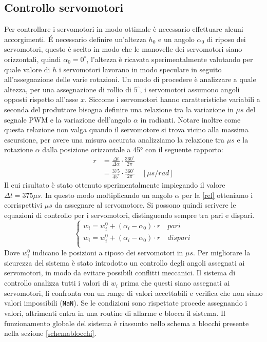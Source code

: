 \documentclass[12pt,twoside,openright]{report}
\begin{document}
\subsection{Controllo servomotori}
Per controllare i servomotori in modo ottimale è necessario effettuare alcuni accorgimenti.
É necessario definire un'altezza $h_0$ e un angolo $\alpha_0$ di riposo dei servomotori, questo è scelto in modo che le manovelle dei servomotori siano orizzontali, quindi $\alpha_0=0^\circ$, l'altezza è ricavata sperimentalmente valutando per quale valore di $h$ i servomotori lavorano in modo speculare in seguito all'assegnazione delle varie rotazioni.
Un modo di procedere è analizzare a quale altezza, per una assegnazione di rollio di $5^\circ$, i servomotori assumono angoli opposti rispetto all'asse $x$.
Siccome i servomotori hanno caratteristiche variabili a seconda del produttore bisogna definire una relazione tra la variazione in $\mu s$ del segnale PWM e la variazione dell'angolo $\alpha$ in radianti. Notare inoltre come questa relazione non valga quando il servomotore si trova vicino alla massima escursione, per avere una misura accurata analizziamo la relazione tra $\mu s$ e la rotazione $\alpha$ dalla posizione orizzontale a 45° con il seguente rapporto:
\begin{align}\label{rel}
r &=\frac{\Delta t}{\Delta\alpha}\cdot \frac{360^\circ}{2 \pi}\nonumber\\
	&= \frac{375}{45^\circ}\cdot \frac{360^\circ}{2 \pi} \quad [\mu s/rad]
\end{align}
Il cui risultato è stato ottenuto sperimentalmente impiegando il valore $\Delta t = 375 \mu s$. In questo modo moltiplicando un angolo $\alpha$ per la \eqref{rel} otteniamo i corrispettivi $\mu s$ da assegnare al servomotore. Si possono quindi scrivere le equazioni di controllo per i servomotori, distinguendo sempre tra pari e dispari.
\begin{equation}\label{w}
    \begin{cases}
      w_i=w_i^0 +(\alpha_i-\alpha_0)\cdot r	\quad pari \\
      w_i=w_i^0 +(\alpha_i-\alpha_0)\cdot r	\quad dispari \\
    \end{cases}
\end{equation}
Dove $w_i^0$ indicano le posizioni a riposo dei servomotori in $\mu s$.
Per migliorare la sicurezza del sistema è stato introdotto un controllo degli angoli assegnati ai servomotori, in modo da evitare possibili conflitti meccanici.
Il sistema di controllo analizza tutti i valori di $w_i$ prima che questi siano assegnati ai servomotori, li confronta con un range di valori accettabili e verifica che non siano valori impossibili (\texttt{NaN}).
Se le condizioni sono rispettate procede assegnando i valori, altrimenti entra in una routine di allarme e blocca il sistema. Il funzionamento globale del sistema è riassunto nello schema a blocchi presente nella sezione \ref{schemablocchi}.
\end{document}
